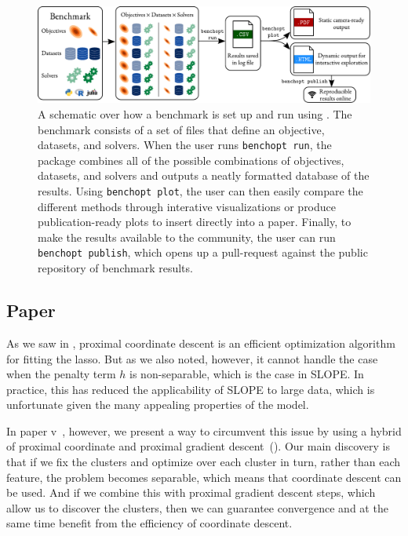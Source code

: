 \begin{figure}[htpb]
  \centering
  \includegraphics[width=\textwidth]{figures/benchopt_schema_objectives_with_logos.pdf}
  \caption{%
    A schematic over how a benchmark is set up and run using . The benchmark consists of a set of files that define an objective, datasets, and solvers. When the user runs \texttt{benchopt run}, the package combines all of the possible combinations of objectives, datasets, and solvers and outputs a neatly formatted database of the results.
    Using \texttt{benchopt plot}, the user can then easily compare the different methods through interative visualizations or produce publication-ready plots to insert directly into a paper.
    Finally, to make the results available to the  community, the user can run \texttt{benchopt publish}, which opens up a pull-request against the public repository of benchmark results.
  }
  \label{fig:paper4-highlight}
\end{figure}

\subsection{Paper \V}

As we saw in , proximal coordinate descent is an efficient optimization algorithm for fitting the lasso. But as we also noted, however, it cannot handle the case when the penalty term \(h\) is non-separable, which is the case in SLOPE. In practice, this has reduced the applicability of SLOPE to large data, which is unfortunate given the many appealing properties of the model.

In paper v~\parencite{larsson2023}, however, we present a way to circumvent this issue by using a hybrid of proximal coordinate and proximal gradient descent~(). Our main discovery is that if we fix the clusters and optimize over each cluster in turn, rather than each feature, the problem becomes separable, which means that coordinate descent can be used. And if we combine this with proximal gradient descent steps, which allow us to discover the clusters, then we can guarantee convergence and at the same time benefit from the efficiency of coordinate descent.

